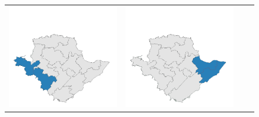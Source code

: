 \begin{figure}[p]
\begin{tabularx}{1\textwidth}{XXXX}
\includegraphics[width=1\linewidth]{images/ch6/mergeoverall/17}&
\includegraphics[width=1\linewidth]{images/ch6/mergeoverall/18}&

\end{tabularx}
\end{figure}
